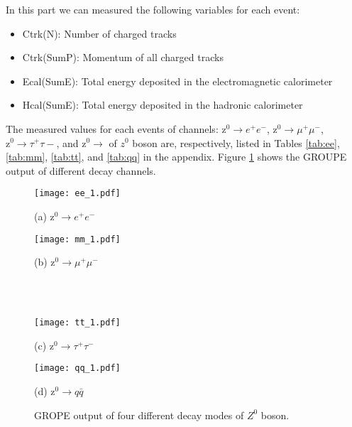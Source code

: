 In this part we can measured the following variables for each event:
\begin{itemize}
	\item Ctrk(N): Number of charged tracks
	\item Ctrk(SumP): Momentum of all charged tracks
	\item Ecal(SumE): Total energy deposited in the electromagnetic calorimeter
	\item Hcal(SumE): Total energy deposited in the hadronic calorimeter
\end{itemize}
The measured values for each events of channels: $ \text{z}^0\rightarrow e^+e^- $, $ \text{z}^0\rightarrow \mu^+\mu^- $, $ \text{z}^0\rightarrow \tau^+\tau-$,  and $ \text{z}^0\rightarrow  $  of $ z^0 $ boson are, respectively, listed in Tables \ref{tab:ee}, \ref{tab:mm}, \ref{tab:tt}, and \ref{tab:qq} in the appendix. Figure \ref{fig:eventsDisplay} shows the GROUPE output of different decay channels.



\begin{figure}[H]   
	\begin{minipage}[t]{0.5\textwidth}
		\texttt{[image: ee\_1.pdf]}
		\begin{center}
			{(a) $  \text{z}^0\rightarrow e^+e^- $}
		\end{center}
	\end{minipage} \quad
	\begin{minipage}[t]{0.5\textwidth}
		\texttt{[image: mm\_1.pdf]}
		\begin{center}
			{(b) $ \text{z}^0\rightarrow \mu^+\mu^- $}
		\end{center}
	\end{minipage}\\\\
	
	
	\begin{minipage}[t]{0.5\textwidth}
		\texttt{[image: tt\_1.pdf]}
		\begin{center}
			{(c) $ \text{z}^0\rightarrow \tau^+\tau^- $}
		\end{center}
	\end{minipage} \quad
\begin{minipage}[t]{0.5\textwidth}
		\texttt{[image: qq\_1.pdf]}
		\begin{center}
			{(d) $ \text{z}^0\rightarrow q \bar{q}$}
		\end{center}
	\end{minipage}
\caption{ GROPE output of four different decay modes of $ Z^0 $ boson.}
\label{fig:eventsDisplay}	
\end{figure}

